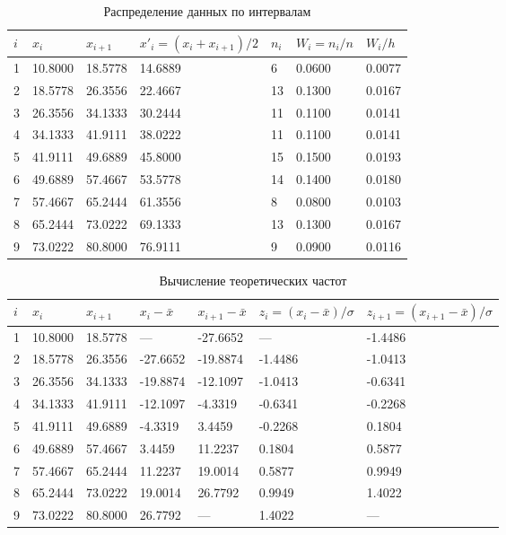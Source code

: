 \documentclass{article}
\theoremstyle{problemstyle}
\begin{document}
\begin{table}[ht]
  \centering
  \begin{tabular}{|l|l|l|l|l|l|l|}
    \hline
    \(i\) & \(x_i\) & \(x_{i+1}\) & \(x'_i = (x_i + x_{i+1})/2\) & \(n_i\) & \(W_i = n_i/n\) & \(W_i/h\) \\
    \hline
1 & 10.8000 & 18.5778 & 14.6889 & 6 & 0.0600 & 0.0077  \\
    \hline
2 & 18.5778 & 26.3556 & 22.4667 & 13 & 0.1300 & 0.0167 \\
    \hline
3 & 26.3556 & 34.1333 & 30.2444 & 11 & 0.1100 & 0.0141 \\
    \hline
4 & 34.1333 & 41.9111 & 38.0222 & 11 & 0.1100 & 0.0141 \\
    \hline
5 & 41.9111 & 49.6889 & 45.8000 & 15 & 0.1500 & 0.0193 \\
    \hline
6 & 49.6889 & 57.4667 & 53.5778 & 14 & 0.1400 & 0.0180 \\
    \hline
7 & 57.4667 & 65.2444 & 61.3556 & 8 & 0.0800 & 0.0103 \\
    \hline
8 & 65.2444 & 73.0222 & 69.1333 & 13 & 0.1300 & 0.0167 \\
    \hline
9 & 73.0222 & 80.8000 & 76.9111 & 9 & 0.0900 & 0.0116 \\
    \hline
  \end{tabular}
  \caption{Распределение данных по интервалам}\label{table:intervals}
\end{table}

\begin{table}[ht]
  \centering
  \begin{tabular}{|l|l|l|l|l|l|l|}
    \hline
    \(i\) & \(x_i\) & \(x_{i+1}\) & \(x_i - \bar x\) & \(x_{i+1} - \bar x\)
    & \(z_i = (x_i -\bar x)/\sigma\) & \(z_{i+1} = (x_{i+1} - \bar x)/\sigma\) \\
\hline
1 & 10.8000 & 18.5778 & --- & -27.6652 & --- & -1.4486 \\
\hline
2 & 18.5778 & 26.3556 & -27.6652 & -19.8874 & -1.4486 & -1.0413 \\
\hline
3 & 26.3556 & 34.1333 & -19.8874 & -12.1097 & -1.0413 & -0.6341 \\
\hline
4 & 34.1333 & 41.9111 & -12.1097 & -4.3319 & -0.6341 & -0.2268 \\
\hline
5 & 41.9111 & 49.6889 & -4.3319 & 3.4459 & -0.2268 & 0.1804 \\
\hline
6 & 49.6889 & 57.4667 & 3.4459 & 11.2237 & 0.1804 & 0.5877 \\
\hline
7 & 57.4667 & 65.2444 & 11.2237 & 19.0014 & 0.5877 & 0.9949 \\
\hline
8 & 65.2444 & 73.0222 & 19.0014 & 26.7792 & 0.9949 & 1.4022 \\
\hline
9 & 73.0222 & 80.8000 & 26.7792 & --- & 1.4022 & --- \\
\hline
  \end{tabular}
  \caption{Вычисление теоретических частот}\label{table:intervals}
\end{table}
\end{document}
